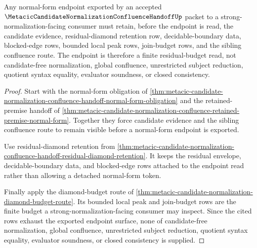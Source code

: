 \begin{theorem}
\label{thm:metacic-candidate-normalization-residual-budget}
Any normal-form endpoint exported by an accepted
$\MetacicCandidateNormalizationConfluenceHandoffUp$ packet to a
strong-normalization-facing consumer must retain, before the endpoint is read,
the candidate evidence, residual-diamond retention row, decidable-boundary data,
blocked-edge rows, bounded local peak rows, join-budget rows, and the sibling
confluence route. The endpoint is therefore a finite residual-budget read, not
candidate-free normalization, global confluence, unrestricted subject reduction,
quotient syntax equality, evaluator soundness, or closed consistency.
\end{theorem}
\begin{proof}
Start with the normal-form obligation of
\autoref{thm:metacic-candidate-normalization-confluence-handoff-normal-form-obligation}
and the retained-premise handoff of
\autoref{thm:metacic-candidate-normalization-confluence-retained-premise-normal-form}.
Together they force candidate evidence and the sibling confluence route to
remain visible before a normal-form endpoint is exported.

Use residual-diamond retention from
\autoref{thm:metacic-candidate-normalization-confluence-handoff-residual-diamond-retention}.
It keeps the residual envelope, decidable-boundary data, and blocked-edge rows
attached to the endpoint read rather than allowing a detached normal-form token.

Finally apply the diamond-budget route of
\autoref{thm:metacic-candidate-normalization-diamond-budget-route}. Its bounded
local peak and join-budget rows are the finite budget a
strong-normalization-facing consumer may inspect. Since the cited rows exhaust
the exported endpoint surface, none of candidate-free normalization, global
confluence, unrestricted subject reduction, quotient syntax equality, evaluator
soundness, or closed consistency is supplied.
\end{proof}


